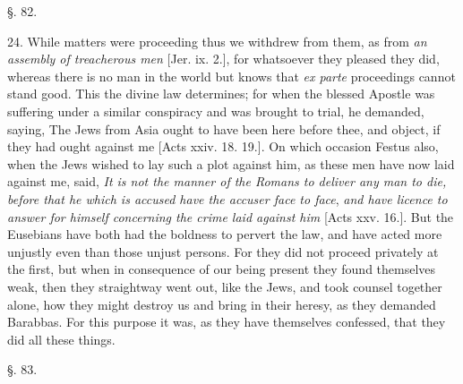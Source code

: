 §. 82.

24. While matters were proceeding thus we
withdrew from them, as from \emph{an assembly of treacherous men} [Jer.
ix. 2.], for whatsoever they pleased they did, whereas there is no man
in the world but knows that \emph{ex parte} proceedings cannot stand
good. This the divine law determines; for when the blessed Apostle was
suffering under a similar conspiracy and was brought to trial, he
demanded, saying, The Jews from Asia ought to have been here before
thee, and object, if they had ought against me [Acts xxiv. 18. 19.].
On which occasion Festus also, when the Jews wished to lay such a plot
against him, as these men have now laid against me, said, \emph{It is not
the manner of the Romans to deliver any man to die, before that he
which is accused have the accuser face to face}, \emph{and have
licence to answer for himself concerning the crime laid against him}
[Acts xxv. 16.]. But the Eusebians have both had the boldness to
pervert the law, and have acted more unjustly even than those unjust
persons. For they did not proceed privately at the first, but when in
consequence of our being present they found themselves weak, then they
straightway went out, like the Jews, and took counsel together alone,
how they might destroy us and bring in their heresy, as they demanded
Barabbas. For this purpose it was, as they have themselves confessed,
that they did all these things.

§. 83.

